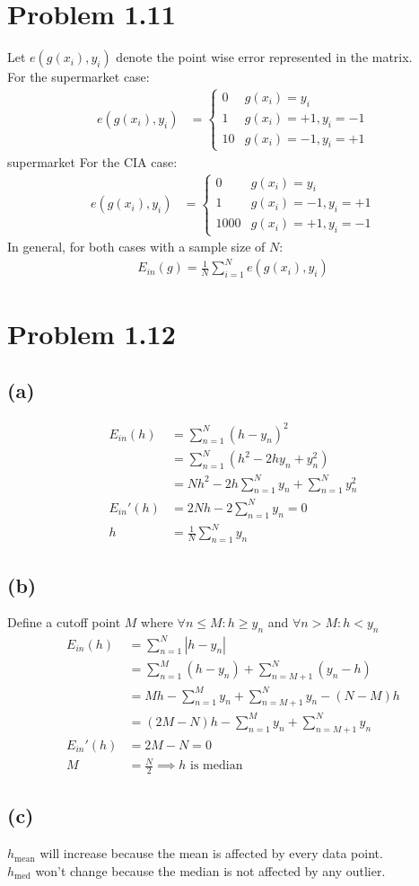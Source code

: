 \documentclass{article}
\begin{document}
	\section*{Problem 1.11}
		Let $e(g(x_i), y_i)$ denote the point wise error represented in the matrix.\\
		For the supermarket case:
		\begin{align*}
			e(g(x_i), y_i) &=
			\begin{cases}
				0 &g(x_i) = y_i\\
				1 &g(x_i) = +1, y_i = -1\\
				10 &g(x_i) = -1, y_i = +1
			\end{cases}
		\end{align*}supermarket
		For the CIA case:
		\begin{align*}
			e(g(x_i), y_i) &=
			\begin{cases}
				0 &g(x_i) = y_i\\
				1 &g(x_i) = -1, y_i = +1\\
				1000 &g(x_i) = +1, y_i = -1
			\end{cases}
		\end{align*}
		In general, for both cases with a sample size of $N$:
		\begin{align*}
			E_{in}(g) = \frac1N \sum\limits_{i=1}^N e(g(x_i), y_i)
		\end{align*}
		
	\section*{Problem 1.12}
	\subsection*{(a)}
		\begin{align*}
			E_{in}(h) &= \sum\limits_{n=1}^N(h - y_n)^2\\
			&= \sum\limits_{n=1}^N(h^2 - 2hy_n + y_n^2)\\
			&= Nh^2 - 2h\sum\limits_{n=1}^Ny_n + \sum\limits_{n=1}^Ny_n^2\\
			E_{in}'(h) &= 2Nh - 2 \sum\limits_{n=1}^Ny_n = 0\\
			h &= \frac1N \sum\limits_{n=1}^Ny_n
		\end{align*}
	\subsection*{(b)}
		Define a cutoff point $M$ where $\forall n \leq M: h \geq y_n$ and $\forall n > M: h < y_n$
		\begin{align*}
			E_{in}(h) &= \sum\limits_{n=1}^N|h - y_n|\\
			&= \sum\limits_{n=1}^M (h - y_n) + \sum\limits_{n=M+1}^N (y_n - h)\\
			&= Mh - \sum\limits_{n=1}^M y_n + \sum\limits_{n=M+1}^N y_n - (N-M)h\\
			&= (2M - N)h - \sum\limits_{n=1}^M y_n + \sum\limits_{n=M+1}^N y_n\\
			E_{in}'(h) &= 2M - N = 0\\
			M &= \frac N2 \implies h \text{ is median}
		\end{align*}
	\subsection*{(c)}
		$h_{\text{mean}}$ will increase because the mean is affected by every data point.\\
		$h_{\text{med}}$ won't change because the median is not affected by any outlier.
\end{document}
